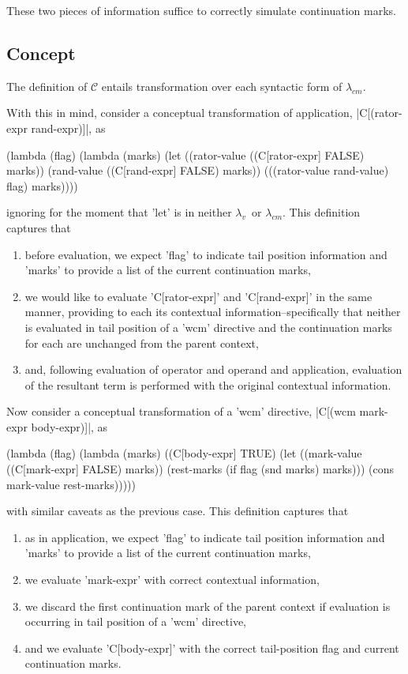 \documentclass{llncs}
\newcommand{\cm}[0]{$\lambda_{cm}$}
\newcommand{\lv}[0]{$\lambda_v$}
\begin{document}

These two pieces of information suffice to correctly simulate continuation marks.

\subsection{Concept}

The definition of $\mathcal{C}$ entails transformation over each syntactic form of \cm.

With this in mind, consider a conceptual transformation of application, \scheme|C[(rator-expr rand-expr)]|, as
\begin{schemedisplay}
(lambda (flag)
  (lambda (marks)
    (let ((rator-value ((C[rator-expr] FALSE) marks))
          (rand-value ((C[rand-expr] FALSE) marks))
      (((rator-value rand-value) flag) marks))))
\end{schemedisplay}
ignoring for the moment that \scheme'let' is in neither \lv\ or \cm. This definition captures that
\begin{enumerate}
\item before evaluation, we expect \scheme'flag' to indicate tail position information and \scheme'marks' to provide a list of the current continuation marks,
\item we would like to evaluate \scheme'C[rator-expr]' and \scheme'C[rand-expr]' in the same manner, providing to each its contextual information--specifically that neither is evaluated in tail position of a \scheme'wcm' directive and the continuation marks for each are unchanged from the parent context,
\item and, following evaluation of operator and operand and application, evaluation of the resultant term is performed with the original contextual information.
\end{enumerate}

Now consider a conceptual transformation of a \scheme'wcm' directive, \scheme|C[(wcm mark-expr body-expr)]|, as
\begin{schemedisplay}
(lambda (flag)
  (lambda (marks)
    ((C[body-expr] TRUE) (let ((mark-value ((C[mark-expr] FALSE) marks))
                               (rest-marks (if flag (snd marks) marks)))
                           (cons mark-value rest-marks)))))
\end{schemedisplay}
with similar caveats as the previous case. This definition captures that
\begin{enumerate}
\item as in application, we expect \scheme'flag' to indicate tail position information and \scheme'marks' to provide a list of the current continuation marks,
\item we evaluate \scheme'mark-expr' with correct contextual information,
\item we discard the first continuation mark of the parent context if evaluation is occurring in tail position of a \scheme'wcm' directive,
\item and we evaluate \scheme'C[body-expr]' with the correct tail-position flag and current continuation marks.
\end{enumerate}
\end{document}
